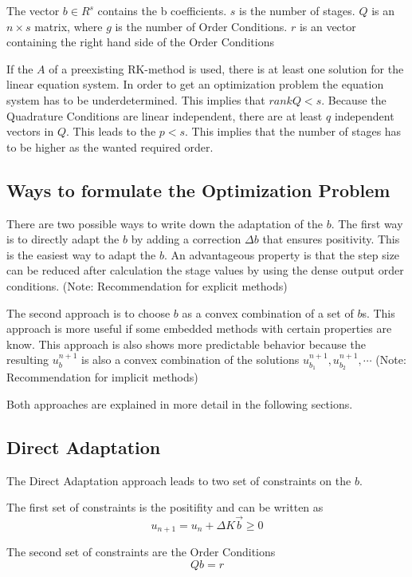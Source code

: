 \documentclass{article}
\begin{document}
The vector $b \in R^s$ contains the b coefficients. $s$ is the number of stages. $Q$ is an $n \times s$ matrix, where $g$ is the number of Order Conditions. $r$ is an vector containing the right hand side of the Order Conditions

If the $A$ of a  preexisting RK-method is used, there is at least one solution for the linear equation system.
In order to get an optimization problem the equation system has to be underdetermined.
This implies that $rank{Q} < s$. 
Because the Quadrature Conditions are linear independent, there are at least $q$ independent vectors in $Q$. This leads to the $p < s$.
This implies that the number of stages has to be higher as the wanted required order.


\subsection{Ways to formulate the Optimization Problem}

There are two possible ways to write down the adaptation of the $b$. The first way is to directly adapt the $b$ by adding a correction  $\Delta b$ that ensures positivity. 
This is the easiest way to adapt the $b$. An advantageous property is that the step size can be reduced after calculation the stage values by using the dense output order conditions.  
(Note: Recommendation for explicit methods)

The second approach is to choose $b$ as a convex combination of a set of $b$s. This approach is more useful if some embedded methods with certain properties are know. 
This approach is also shows more  predictable behavior because the resulting $u^{n+1}_b$ is also a convex combination of the solutions $u^{n+1}_{b_1},u^{n+1}_{b_2},\cdots$ 
(Note: Recommendation for implicit methods)


Both approaches are explained in more detail in the following sections.


\subsection{Direct Adaptation}

The Direct Adaptation approach leads to two set of constraints on the $b$.

The first set of constraints is the positifity and can be written as 
$$u_{n+1}=u_n+\Delta K \vec{b} \geq 0$$

The second set of constraints are the Order Conditions
$$Qb=r$$
\end{document}
